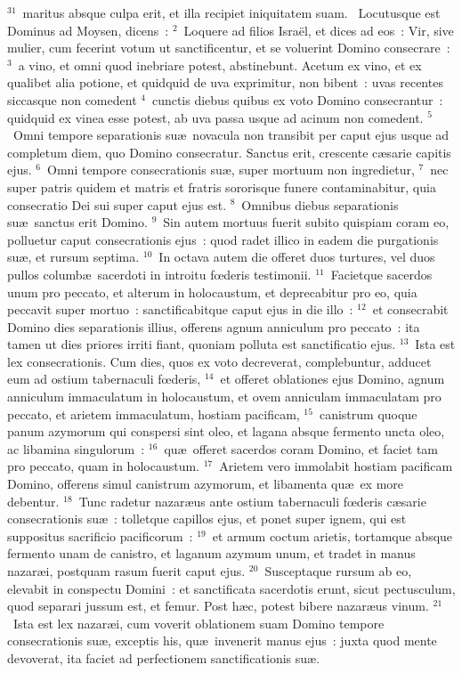 ${}^{31}$~maritus absque culpa erit, et illa recipiet iniquitatem suam.
~\lettrine[lines=10,image=true,loversize=0.05,lraise=-0.03]{L}{}ocutusque est Dominus ad Moysen, dicens~:
${}^{2}$~Loquere ad filios Isra\"el, et dices ad eos~: Vir, sive mulier, cum fecerint votum ut sanctificentur, et se voluerint Domino consecrare~:
${}^{3}$~a vino, et omni quod inebriare potest, abstinebunt. Acetum ex vino, et ex qualibet alia potione, et quidquid de uva exprimitur, non bibent~: uvas recentes siccasque non comedent
${}^{4}$~cunctis diebus quibus ex voto Domino consecrantur~: quidquid ex vinea esse potest, ab uva passa usque ad acinum non comedent.
${}^{5}$~Omni tempore separationis su\ae\ novacula non transibit per caput ejus usque ad completum diem, quo Domino consecratur. Sanctus erit, crescente c\ae sarie capitis ejus.
${}^{6}$~Omni tempore consecrationis su\ae , super mortuum non ingredietur,
${}^{7}$~nec super patris quidem et matris et fratris sororisque funere contaminabitur, quia consecratio Dei sui super caput ejus est.
${}^{8}$~Omnibus diebus separationis su\ae\ sanctus erit Domino.
${}^{9}$~Sin autem mortuus fuerit subito quispiam coram eo, polluetur caput consecrationis ejus~: quod radet illico in eadem die purgationis su\ae , et rursum septima.
${}^{10}$~In octava autem die offeret duos turtures, vel duos pullos columb\ae\ sacerdoti in introitu fœderis testimonii.
${}^{11}$~Facietque sacerdos unum pro peccato, et alterum in holocaustum, et deprecabitur pro eo, quia peccavit super mortuo~: sanctificabitque caput ejus in die illo~:
${}^{12}$~et consecrabit Domino dies separationis illius, offerens agnum anniculum pro peccato~: ita tamen ut dies priores irriti fiant, quoniam polluta est sanctificatio ejus.
${}^{13}$~Ista est lex consecrationis. Cum dies, quos ex voto decreverat, complebuntur, adducet eum ad ostium tabernaculi fœderis,
${}^{14}$~et offeret oblationes ejus Domino, agnum anniculum immaculatum in holocaustum, et ovem anniculam immaculatam pro peccato, et arietem immaculatum, hostiam pacificam,
${}^{15}$~canistrum quoque panum azymorum qui conspersi sint oleo, et lagana absque fermento uncta oleo, ac libamina singulorum~:
${}^{16}$~qu\ae\ offeret sacerdos coram Domino, et faciet tam pro peccato, quam in holocaustum.
${}^{17}$~Arietem vero immolabit hostiam pacificam Domino, offerens simul canistrum azymorum, et libamenta qu\ae\ ex more debentur.
${}^{18}$~Tunc radetur nazar\ae us ante ostium tabernaculi fœderis c\ae sarie consecrationis su\ae~: tolletque capillos ejus, et ponet super ignem, qui est suppositus sacrificio pacificorum~:
${}^{19}$~et armum coctum arietis, tortamque absque fermento unam de canistro, et laganum azymum unum, et tradet in manus nazar\ae i, postquam rasum fuerit caput ejus.
${}^{20}$~Susceptaque rursum ab eo, elevabit in conspectu Domini~: et sanctificata sacerdotis erunt, sicut pectusculum, quod separari jussum est, et femur. Post h\ae c, potest bibere nazar\ae us vinum.
${}^{21}$~Ista est lex nazar\ae i, cum voverit oblationem suam Domino tempore consecrationis su\ae , exceptis his, qu\ae\ invenerit manus ejus~: juxta quod mente devoverat, ita faciet ad perfectionem sanctificationis su\ae .


